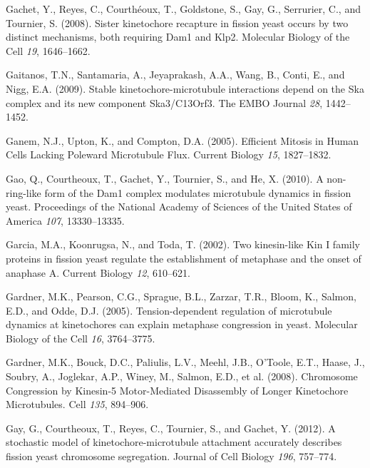 \documentclass[12pt,a4paper,twoside,openright]{book}
\begin{document}
Gachet, Y., Reyes, C., Courthéoux, T., Goldstone, S., Gay, G.,
Serrurier, C., and Tournier, S. (2008). Sister kinetochore recapture in
fission yeast occurs by two distinct mechanisms, both requiring Dam1 and
Klp2. Molecular Biology of the Cell \emph{19}, 1646--1662.

Gaitanos, T.N., Santamaria, A., Jeyaprakash, A.A., Wang, B., Conti, E.,
and Nigg, E.A. (2009). Stable kinetochore-microtubule interactions
depend on the Ska complex and its new component Ska3/C13Orf3. The EMBO
Journal \emph{28}, 1442--1452.

Ganem, N.J., Upton, K., and Compton, D.A. (2005). Efficient Mitosis in
Human Cells Lacking Poleward Microtubule Flux. Current Biology
\emph{15}, 1827--1832.

Gao, Q., Courtheoux, T., Gachet, Y., Tournier, S., and He, X. (2010). A
non-ring-like form of the Dam1 complex modulates microtubule dynamics in
fission yeast. Proceedings of the National Academy of Sciences of the
United States of America \emph{107}, 13330--13335.

Garcia, M.A., Koonrugsa, N., and Toda, T. (2002). Two kinesin-like Kin I
family proteins in fission yeast regulate the establishment of metaphase
and the onset of anaphase A. Current Biology \emph{12}, 610--621.

Gardner, M.K., Pearson, C.G., Sprague, B.L., Zarzar, T.R., Bloom, K.,
Salmon, E.D., and Odde, D.J. (2005). Tension-dependent regulation of
microtubule dynamics at kinetochores can explain metaphase congression
in yeast. Molecular Biology of the Cell \emph{16}, 3764--3775.

Gardner, M.K., Bouck, D.C., Paliulis, L.V., Meehl, J.B., O'Toole, E.T.,
Haase, J., Soubry, A., Joglekar, A.P., Winey, M., Salmon, E.D., et al.
(2008). Chromosome Congression by Kinesin-5 Motor-Mediated Disassembly
of Longer Kinetochore Microtubules. Cell \emph{135}, 894--906.

Gay, G., Courtheoux, T., Reyes, C., Tournier, S., and Gachet, Y. (2012).
A stochastic model of kinetochore-microtubule attachment accurately
describes fission yeast chromosome segregation. Journal of Cell Biology
\emph{196}, 757--774.
\end{document}
